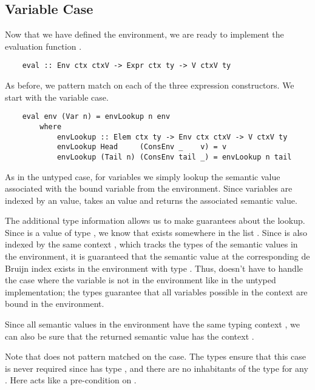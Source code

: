 
\subsection{Variable Case}
\label{subsect:typedVarCase}

Now that we have defined the environment, we are ready to implement the evaluation function .

\begin{lstlisting}
    eval :: Env ctx ctxV -> Expr ctx ty -> V ctxV ty
\end{lstlisting}

As before, we pattern match on each of the three expression constructors. We start with the variable case.

\begin{lstlisting}
    eval env (Var n) = envLookup n env
        where
            envLookup :: Elem ctx ty -> Env ctx ctxV -> V ctxV ty 
            envLookup Head     (ConsEnv _    v) = v
            envLookup (Tail n) (ConsEnv tail _) = envLookup n tail
\end{lstlisting}

As in the untyped case, for variables we simply lookup the semantic value associated with the bound variable from the environment. Since variables are indexed by an  value,  takes an  value and returns the associated semantic value.

The additional type information allows us to make guarantees about the lookup. Since  is a value of type , we know that  exists somewhere in the list . Since  is also indexed by the same context , which tracks the types of the semantic values in the environment, it is guaranteed that the semantic value at the corresponding de Bruijn index exists in the environment with type . Thus,  doesn't have to handle the case where the variable is not in the environment like in the untyped implementation; the types guarantee that all variables possible in the context  are bound in the environment.

Since all semantic values in the environment have the same typing context , we can also be sure that the returned semantic value has the context .

Note that  does not pattern matched on the  case. The types ensure that this case is never required since  has type , and there are no inhabitants of the type  for any . Here  acts like a pre-condition on .

